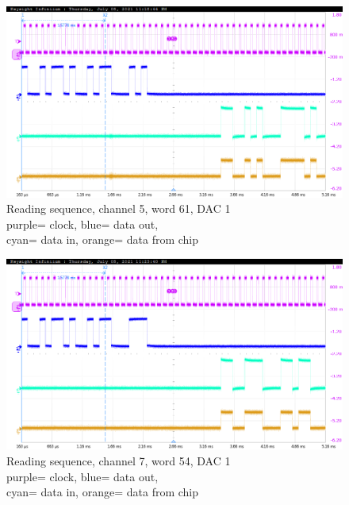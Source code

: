 \begin{figure}[H]
	\centering
	\includegraphics[width=0.6\linewidth]{IMG/ch5/probe/09-08-2021_ch05-read61-baselinedac1}
	\caption{Reading sequence, channel 5, word 61, DAC 1\\{\color{magenta}purple}= clock, {\color{blue}blue}= data out,\\{\color{cyan}cyan}= data in, {\color{orange}orange}= data from chip}
	\label{fig:ch05write61}
\end{figure}

\begin{figure}[H]
	\centering
	\includegraphics[width=0.6\linewidth]{IMG/ch5/probe/09-08-2021_ch07-read54-baselinedac1}
	\caption{Reading sequence, channel 7, word 54, DAC 1\\{\color{magenta}purple}= clock, {\color{blue}blue}= data out,\\{\color{cyan}cyan}= data in, {\color{orange}orange}= data from chip}
	\label{fig:ch07write54}
\end{figure}